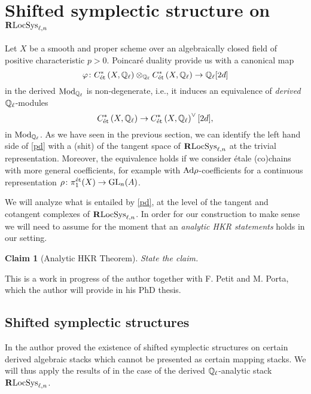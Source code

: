 \documentclass[10pt,a4paper]{amsart}
\numberwithin{equation}{subsection}
\theoremstyle{plain}
\newtheorem{claim}[theorem]{Claim}
\theoremstyle{definition}
\theoremstyle{remark}
\numberwithin{equation}{section}
\begin{document}
\section{Shifted symplectic structure on $\mathbf R \mathrm{LocSys}_{\ell, n}$}



 
Let $X$ be a smooth and proper scheme over an algebraically closed field of positive characteristic $p>0$. Poincar\'e duality provide us with a canonical map
	\[
		\varphi \colon C^*_{\text{\'et}} \left( X , \mathbb{Q}_\ell \right) \otimes_{\mathbb{Q}_\ell}  C^*_{\text{\'et}} \left( X , \mathbb{Q}_\ell \right)  \to \mathbb{Q}_\ell[ 2 d]
	\]
in the derived \infcat $\mathrm{Mod}_{\mathbb{Q}_\ell}$ is non-degenerate, i.e., it induces an equivalence of \emph{derived} $\mathbb{Q}_\ell$-modules
	\begin{equation} \label{pd}
		 C^*_{\text{\'et}} \left( X , \mathbb{Q}_\ell \right) \to  C^*_{\text{\'et}} \left( X , \mathbb{Q}_\ell \right) ^\vee [2d],
	\end{equation}
in $\mathrm{Mod}_{\mathbb{Q}_\ell}$. As we have seen in the previous section, we can identify the left hand side of \eqref{pd} with a (shit) of the tangent space of $\mathbf R \mathrm{LocSys}_{\ell, n}$ at the trivial representation. Moreover, the equivalence \label{pd} holds if we consider \'etale (co)chains
with more general coefficients, for example with $\mathrm{Ad} \rho$-coefficients for a continuous representation $\rho \colon \pi_1^{\text{\'et}}(X) \to \mathrm{GL}_n(A)$.

We will analyze what is entailed by \eqref{pd}, at the level of the tangent and cotangent complexes of $\mathbf R \mathrm{LocSys}_{\ell, n}$. In order for our construction to make sense we will need to assume for the moment that an \emph{analytic HKR statements} holds in our setting.

\begin{claim}[Analytic HKR Theorem]
State the claim.
\end{claim}

This is a work in progress of the author together with F. Petit and M. Porta, which the author will provide in his PhD thesis.

\subsection{Shifted symplectic structures}

In \cite{toen_ss} the author proved the existence of shifted symplectic structures on certain derived algebraic stacks which cannot be presented as certain mapping stacks. We will thus apply the results of \cite{toen_ss} in the case of the derived
$\mathbb{Q}_\ell$-analytic stack $\mathbf R \mathrm{LocSys}_{\ell, n}$. 
\end{document}
